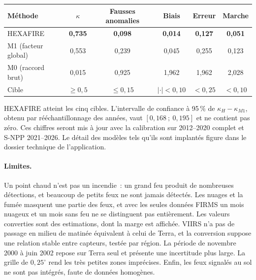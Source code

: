 \documentclass[11pt,a4paper]{article}
\begin{document}
\begin{center}\small
\begin{tabular}{lccccc}
\toprule
Méthode & $\kappa$ & Fausses anomalies & Biais & Erreur & Marche \\
\midrule
HEXAFIRE & \textbf{0,735} & \textbf{0,098} & \textbf{0,014} & \textbf{0,127} & \textbf{0,051} \\
M1 (facteur global) & 0,553 & 0,239 & 0,045 & 0,255 & 0,123 \\
M0 (raccord brut) & 0,015 & 0,925 & 1,962 & 1,962 & 2,028 \\
\midrule
Cible & $\geq 0{,}5$ & $\leq 0{,}15$ & $|\cdot|<0{,}10$ & $<0{,}25$ & $<0{,}10$ \\
\bottomrule
\end{tabular}
\end{center}

HEXAFIRE atteint les cinq cibles. L'intervalle de confiance à 95\,\% de $\kappa_H-\kappa_{M1}$, obtenu par rééchantillonnage des années, vaut $[0{,}168~;~0{,}195]$ et ne contient pas zéro. Ces chiffres seront mis à jour avec la calibration sur 2012--2020 complet et S-NPP 2021--2026. Le détail des modèles tels qu'ils sont implantés figure dans le dossier technique de l'application.

\paragraph{Limites.} Un point chaud n'est pas un incendie~: un grand feu produit de nombreuses détections, et beaucoup de petits feux ne sont jamais détectés. Les nuages et la fumée masquent une partie des feux, et avec les seules données FIRMS un mois nuageux et un mois sans feu ne se distinguent pas entièrement. Les valeurs converties sont des estimations, dont la marge est affichée. VIIRS n'a pas de passage en milieu de matinée équivalent à celui de Terra, et la conversion suppose une relation stable entre capteurs, testée par région. La période de novembre 2000 à juin 2002 repose sur Terra seul et présente une incertitude plus large. La grille de $0{,}25^\circ$ rend les très petites zones imprécises. Enfin, les feux signalés au sol ne sont pas intégrés, faute de données homogènes.
\end{document}

